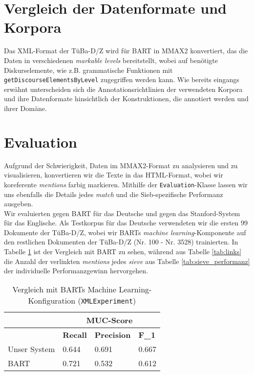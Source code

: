 \documentclass{scrartcl}
\begin{document}
\section{Vergleich der Datenformate und Korpora}
Das XML-Format der TüBa-D/Z wird für BART in MMAX2 \cite{muller2006} konvertiert, das die Daten in verschiedenen \textit{markable levels} bereitstellt, wobei auf benötigte Diskurselemente, wie z.B. grammatische Funktionen mit \texttt{getDiscourseElementsByLevel} zugegriffen werden kann. Wie bereits eingangs erwähnt unterscheiden sich die Annotationsrichtlinien der verwendeten Korpora und ihre Datenformate hinsichtlich der Konstruktionen, die annotiert werden und ihrer Domäne.

\section{Evaluation}
Aufgrund der Schwierigkeit, Daten im MMAX2-Format zu analysieren und zu visualisieren, konvertieren wir die Texte in das HTML-Format, wobei wir koreferente \textit{mentions} farbig markieren. Mithilfe der \texttt{Evaluation}-Klasse lassen wir uns ebenfalls die Details jedes \textit{match} und die Sieb-spezifische Performanz ausgeben.\\
Wir evaluierten gegen BART für das Deutsche und gegen das Stanford-System für das Englische. Als Testkorpus für das Deutsche verwendeten wir die ersten 99 Dokumente der TüBa-D/Z, wobei wir BARTs \textit{machine learning}-Komponente auf den restlichen Dokumenten der TüBa-D/Z (Nr. 100 - Nr. 3528) trainierten. In Tabelle \ref{tab:ml_vergleich} ist der Vergleich mit BART zu sehen, während aus Tabelle \ref{tab:links} die Anzahl der verlinkten \textit{mentions} jedes \textit{sieve}  aus Tabelle \ref{tab:sieve_performanz} der individuelle Performanzgewinn hervorgehen.
\begin{table}[h]
\begin{tabular}{l||ll|l}
& \multicolumn{3}{c}{\textbf{MUC-Score}} \\ \hline
               & \textbf{Recall}		 & \textbf{Precision} & \textbf{F\_1}    \\ \hline
Unser System 	& 0.644      & 0.691              & 0.667  \\
BART  & 0.721 		 & 0.532     & 0.612
\end{tabular}
\caption{Vergleich mit BARTs Machine Learning-Konfiguration (\texttt{XMLExperiment})}
\label{tab:ml_vergleich}
\end{table}
\end{document}
